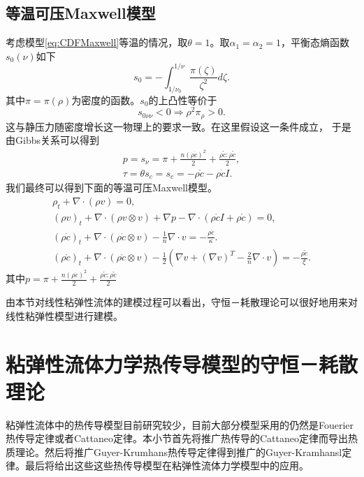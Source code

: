 	\subsection{等温可压Maxwell模型}
	考虑模型\eqref{eq:CDFMaxwell}等温的情况，取$\theta=1$。取$\alpha_1=\alpha_2=1$，平衡态熵函数$s_0(\nu)$如下
	\begin{equation*}
		s_0 = - \int_{1/\nu_0}^{1/\nu} \frac{\pi(\zeta)}{\zeta^2} d\zeta.
	\end{equation*}
	其中$\pi=\pi(\rho)$为密度的函数。$s_0$的上凸性等价于
	\begin{equation*}
		s_{0\nu \nu} < 0 \Rightarrow \rho^2 \pi_\rho >0.
	\end{equation*}
	这与静压力随密度增长这一物理上的要求一致。在这里假设这一条件成立，
	于是由Gibbs关系可以得到
	\begin{eqnarray*}
		p = s_{\nu}= \pi + \frac{n(\rho \dot{c})^2}{2} + \frac{\rho \mathring{c}:\rho \mathring{c}}{2}, \\
		\tau = \theta s_c = s_c = - \rho \mathring{c} - \rho \dot{c} I.
	\end{eqnarray*}
	我们最终可以得到下面的等温可压Maxwell模型。
	\begin{subequations}\label{eq:CDFalphaConst}
		\begin{align}
			\rho_t + \nabla \cdot (\rho v) = 0, \\
			(\rho v)_t + \nabla \cdot (\rho v \otimes v) + \nabla p - \nabla \cdot ( \rho \dot{c} I +  \rho \mathring{c}) = 0, \\
			(\rho \dot{c})_t  + \nabla \cdot(\rho \dot{c} \otimes v) -  \frac{1}{n} \nabla \cdot v = - \frac{\rho \dot{c}}{\kappa}. \\
			(\rho \mathring{c})_t + \nabla \cdot (\rho \mathring{c} \otimes v) - \frac{1}{2} (\nabla v + (\nabla v)^T - \frac{2}{n} \nabla \cdot v) = - \frac{\rho \mathring{c}}{\xi}.
		\end{align}
	\end{subequations}
	其中$p = \pi + \frac{n(\rho \dot{c})^2}{2} + \frac{\rho \mathring{c}:\rho \mathring{c}}{2}$

	由本节对线性粘弹性流体的建模过程可以看出，守恒－耗散理论可以很好地用来对线性粘弹性模型进行建模。

	\section{粘弹性流体力学热传导模型的守恒－耗散理论}
	粘弹性流体中的热传导模型目前研究较少，目前大部分模型采用的仍然是Fouerier热传导定律或者Cattaneo定律。本小节首先将推广热传导的Cattaneo定律而导出热质理论。然后将推广Guyer-Krumhans热传导定律得到推广的Guyer-Kramhansl定律。最后将给出这些这些热传导模型在粘弹性流体力学模型中的应用。

